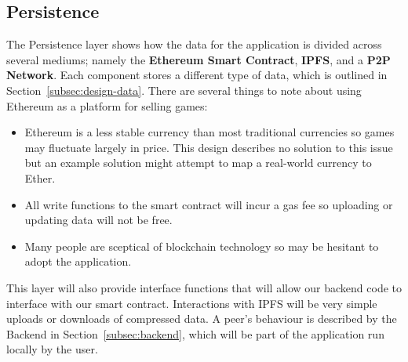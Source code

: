 
\subsection{Persistence}

The Persistence layer shows how the data for the application is divided across several mediums; namely the \textbf{Ethereum Smart Contract}, \textbf{IPFS}, and a \textbf{P2P Network}. Each component stores a different type of data, which is outlined in Section~\ref{subsec:design-data}.
\x
There are several things to note about using Ethereum as a platform for selling games:

\begin{itemize}
  \item Ethereum is a less stable currency than most traditional currencies so games may fluctuate largely in price. This design describes no solution to this issue but an example solution might attempt to map a real-world currency to Ether.
  \item All write functions to the smart contract will incur a gas fee so uploading or updating data will not be free.
  \item Many people are sceptical of blockchain technology so may be hesitant to adopt the application.
\end{itemize}

\newparagraph
This layer will also provide interface functions that will allow our backend code to interface with our smart contract. Interactions with IPFS will be very simple uploads or downloads of compressed data.
\x
A peer's behaviour is described by the Backend in Section~\ref{subsec:backend}, which will be part of the application run locally by the user.